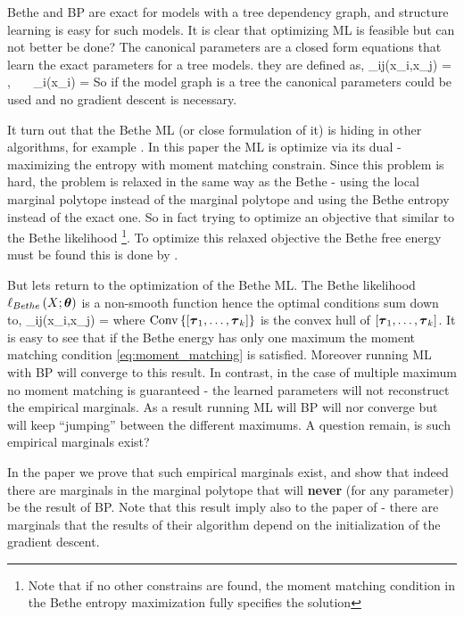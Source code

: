 Bethe and BP are exact for models with a tree dependency graph, and structure learning is easy for such models.
It is clear that optimizing ML is feasible but can not better be done?  
The canonical parameters are a closed form equations that learn the exact parameters for a tree models.
they are defined as,
\be
\label{eq:canonical}
\theta_{ij}(x_i,x_j) = , \ \ \ \theta_i(x_i) = 
\ee
So if the model graph is a tree the canonical parameters could be used and no gradient descent is necessary.

It turn out that the Bethe ML (or close formulation of it) is hiding in other algorithms, for example  \cite{ganapathi2012constrained}.
In this paper the ML is optimize via its dual - maximizing the entropy with moment matching constrain.
Since this problem is hard, the problem is relaxed in the same way as the Bethe - using the local marginal polytope  instead of the marginal polytope and using the Bethe entropy instead of the exact one.
So in fact trying to optimize an objective that similar to the Bethe likelihood \footnote{Note that if no other constrains are found, the moment matching condition in the Bethe entropy maximization fully specifies the solution}.
To optimize this relaxed objective the Bethe free energy must be found this is done by \cite{yuille2002cccp}.

But lets return to the optimization of the Bethe ML.
The Bethe likelihood $\ell_{Bethe}\left(X;\boldsymbol{\theta}\right)$ is a non-smooth function hence the optimal conditions sum down to,
\be
\mu_{ij}(x_i,x_j) = 
\ee
where $\text{Conv}\left\{[\boldsymbol{\tau}_1,\ldots,\boldsymbol{\tau}_k]\right\}$ is the convex hull of $[\boldsymbol{\tau}_1,\ldots,\boldsymbol{\tau}_k]$.
It is easy to see that if the Bethe energy has only one maximum the moment matching condition \eqref{eq:moment_matching} is satisfied.
Moreover running ML with BP will converge to this result.
In contrast, in the case of multiple maximum no moment matching is guaranteed - the learned parameters will not reconstruct the empirical marginals.
As a result running ML will BP will nor converge but will keep ``jumping'' between the different maximums. 
A question remain, is such empirical marginals exist?

In the paper \cite{heinemann2012cannot} we prove that such empirical marginals exist, and show that indeed there are marginals in the marginal polytope that will \textbf{never} (for any parameter) be the result of BP.
Note that this result imply also to the paper of \cite{ganapathi2012constrained} - there are marginals that the results of their algorithm depend on the initialization of the gradient descent.   

